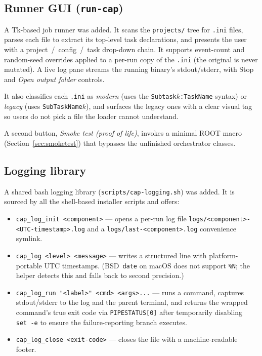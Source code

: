 \documentclass[11pt,a4paper]{article}
\begin{document}
\subsection{Runner GUI (\texttt{run-cap})}

A Tk-based job runner was added. It scans the \texttt{projects/} tree for
\texttt{.ini} files, parses each file to extract its top-level task
declarations, and presents the user with a project~/~config~/~task drop-down
chain. It supports event-count and random-seed overrides applied to a
per-run copy of the \texttt{.ini} (the original is never mutated). A live
log pane streams the running binary's stdout/stderr, with Stop and
\emph{Open output folder} controls.

It also classifies each \texttt{.ini} as \emph{modern}
(uses the \texttt{Subtask$k$:TaskName} syntax) or \emph{legacy} (uses
\texttt{SubTaskName$k$}), and surfaces the legacy ones with a clear visual
tag so users do not pick a file the loader cannot understand.

A second button, \emph{Smoke test (proof of life)}, invokes a minimal ROOT
macro (Section~\ref{sec:smoketest}) that bypasses the unfinished orchestrator
classes.

\subsection{Logging library}

A shared bash logging library
(\texttt{scripts/cap-logging.sh}) was added. It is sourced by all the
shell-based installer scripts and offers:

\begin{itemize}[leftmargin=2em,itemsep=0pt]
  \item \texttt{cap\_log\_init <component>} --- opens a per-run log file
        \texttt{logs/<component>-<UTC-timestamp>.log} and a
        \texttt{logs/last-<component>.log} convenience symlink.
  \item \texttt{cap\_log <level> <message>} --- writes a structured line
        with platform-portable UTC timestamps. (BSD~\texttt{date} on macOS
        does not support \texttt{\%N}; the helper detects this and falls
        back to second precision.)
  \item \texttt{cap\_log\_run "<label>" <cmd> <args>...} --- runs a command,
        captures stdout/stderr to the log and the parent terminal, and
        returns the wrapped command's true exit code via
        \texttt{PIPESTATUS[0]} after temporarily disabling
        \texttt{set~-e} to ensure the failure-reporting branch executes.
  \item \texttt{cap\_log\_close <exit-code>} --- closes the file with a
        machine-readable footer.
\end{itemize}
\end{document}
